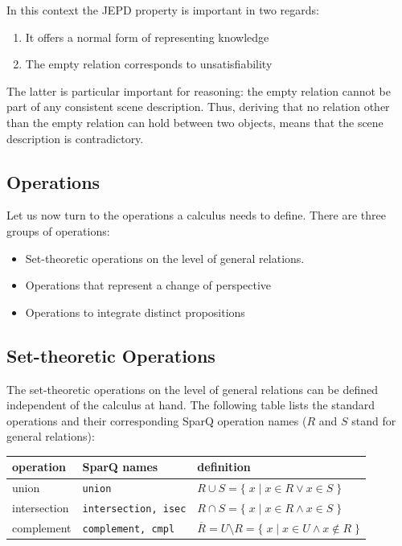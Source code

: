\documentclass[headsepline]{scrreprt}
\theoremstyle{definition}
\newcommand{\engine}{SparQ}
\begin{document}
In this context the JEPD property is important in two regards:
\begin{enumerate}
	\item It offers a normal form of representing knowledge
	\item The empty relation corresponds to unsatisfiability
\end{enumerate}

The latter is particular important for reasoning: the empty relation cannot be part of any consistent scene description. Thus, deriving that no relation other than the empty relation can hold between two objects, means that the scene description is contradictory.

\subsection{Operations}\label{sec:operations}

Let us now turn to the operations a calculus needs to define.
There are three groups of operations:
\begin{itemize}
	\item Set-theoretic operations on the level of general relations.
	\item Operations that represent a change of perspective
	\item Operations to integrate distinct propositions
\end{itemize}

\subsection{Set-theoretic Operations}
The set-theoretic operations on the level of general relations
can be defined independent of the calculus at hand. The following table lists the standard operations and
their corresponding \engine{} operation names ($R$ and $S$ stand for general relations):

\begin{tabular}{|l|l|l|}\hline
{\bf operation} & {\bf \engine{} names} & {\bf definition} \\ \hline \hline
union & {\tt union} & $R \cup S = \{\; x\; |\; x \in R \vee x \in S\;\}$\\
intersection & {\tt intersection, isec} & $R \cap S = \{\; x\; |\; x \in R \wedge x \in S\;\}$\\
complement & {\tt complement, cmpl}&  $\overline{R} = U \setminus R = \{\; x\; |\; x \in U \wedge x \not\in R\; \}$\\ \hline
\end{tabular}
\end{document}

